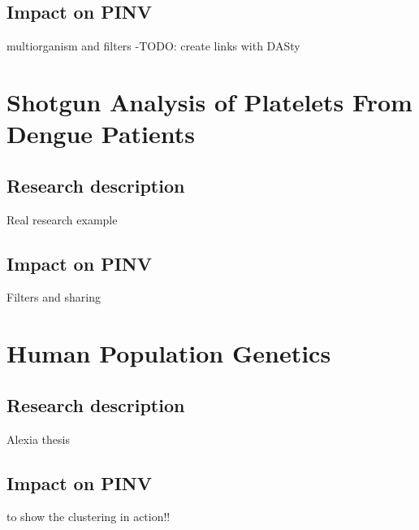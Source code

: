 \subsection{Impact on PINV}
multiorganism and filters -TODO: create links with DASty

\section{Shotgun Analysis of Platelets From Dengue Patients}
\label{sec:dengue}
\subsection{Research description}
Real research example

\subsection{Impact on PINV}
Filters and sharing

\section{Human Population Genetics}
\label{sec:pop_genetics}
\subsection{Research description}
Alexia thesis
\subsection{Impact on PINV}
to show the clustering in action!! 


